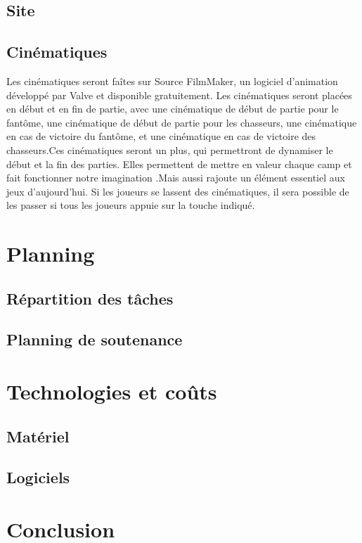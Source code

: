 \documentclass[10pt]{article} %
\begin{document}
\subsection{Site}



\subsection{Cinématiques}

Les cinématiques seront faîtes sur Source FilmMaker, un logiciel d'animation développé par Valve et disponible gratuitement. Les cinématiques seront placées en début et en fin de partie, avec une cinématique de début de partie pour le fantôme, une cinématique de début de partie pour les chasseurs, une cinématique en cas de victoire du fantôme, et une cinématique en cas de victoire des chasseurs.Ces cinématiques seront un plus, qui permettront de dynamiser le début et la fin des parties. Elles permettent de mettre en valeur chaque camp et fait fonctionner notre imagination .Mais aussi rajoute un élément essentiel aux jeux d'aujourd'hui. Si les joueurs se lassent des cinématiques, il sera possible de les passer si tous les joueurs appuie sur la touche indiqué.    

\section{Planning}



\subsection{Répartition des tâches}



\subsection{Planning de soutenance}



\section{Technologies et coûts}



\subsection{Matériel}



\subsection{Logiciels}



\section{Conclusion}
\end{document}
